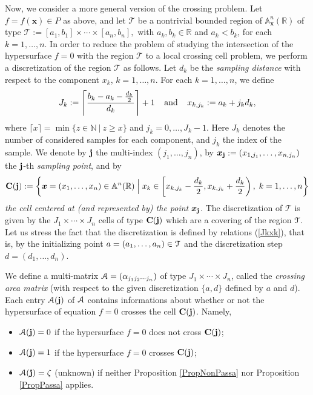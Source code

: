 \documentclass[10pt]{article}
\newcommand\sA{{\cal A}}
\newcommand\sT{{\cal T}}
\newcommand\gra{\alpha}
\newcommand\reals{{\mathbb R}}
\newcommand{\x}{{\bm x}}
\begin{document}
{Now, we consider a more general version of the crossing problem. 
Let $f=f(\x)\in P$  as above, and let $\mathcal T$ be a nontrivial bounded region 
of ${\mathbb A}_{\x}^n(\reals)$ of   type
$
\mathcal T := [a_1,b_1] \times \cdots \times [a_n,b_n],
$
with $a_k, b_k \in \reals$ and $a_k < b_k$, for each $k=1,\ldots,n$.
In order to reduce the problem of studying the intersection  of the hypersurface $f=0$  with the region $\mathcal T$
to a local crossing cell problem, we perform a discretization of 
the region $\mathcal T$ as follows.
Let $d_k$ be  the {\em sampling distance} with respect to the  component $x_k$, $k=1,\ldots,n$.
For each $k=1,\ldots,n$, we define 
\begin{equation}\label{Jkxk}
 J_k := \left \lceil \frac{b_k-a_k- \frac{d_k}{2}}{d_k} \right \rceil + 1 \; \;\;\; {\rm and} \;\;\; \;x_{k,j_k} :=a_k + j_k d_k,   
\end{equation}
where $\lceil x \rceil = \min\{z \in \mathbb N \:|\: z  \ge x\}$ and
$j_k=0,\ldots, J_k-1$. Here $J_k$ denotes the number of considered samples for each component, and $j_k$ the index of the sample.
We denote by ${\bf j}$ the multi-index $(j_1,\ldots, j_n)$,
by ${\x}_{\bf j}:=(x_{1,j_1},\ldots,x_{n, j_n})$ the ${\bf j}$-th {\em sampling point}, 
and by
\begin{equation*}\label{cells}
{\bf C}({\bf j}):=\left\{ {\x} =( x_1,\ldots, x_n ) \in \mathbb A^n(\reals) \; \Big| \;  
x_k\in \left[x_{k,j_k}-\frac{d_k}{2}, x_{k,j_k}+\frac{d_k}{2}\right),\; k=1,\ldots,n \right\} 
\end{equation*}
{\em the cell centered at (and represented by) the point} ${\x}_{\bf j}$.
The discretization of $\mathcal T$ is given by the $J_1\times \cdots \times J_n$ cells 
of type ${\bf C}({\bf j})$ which are  a covering of the region $\sT$.
Let us stress the fact that the discretization is defined by relations (\ref{Jkxk}), that is, 
by the initializing point $a=(a_1,\ldots,a_n) \in \sT$ and the discretization step 
$d=(d_1,\ldots,d_n)$. 

 We define 
a multi-matrix $\sA=(\gra_{j_1j_2\cdots j_n})$ of type $ J_1\times \cdots \times J_n$, 
called the {\em crossing area  matrix} (with respect to the given discretization $\{a,d\}$ defined by $a$ and $d$).   
Each entry $\sA({\bf j})$ of $\sA$ contains informations about  whether or not  the hypersurface  of equation  $f=0$  crosses the cell ${\bf C}({\bf j})$.
Namely,
\begin{itemize}
\item $\sA({\bf j})=0$ if the hypersurface $f=0$ does not cross ${\bf C}({\bf j})$;
\item $\sA({\bf j})=1$ if the hypersurface  $f=0$ crosses ${\bf C}({\bf j})$;
\item $\sA({\bf j})=\zeta$ (unknown) if neither Proposition \ref{PropNonPassa} nor Proposition  \ref{PropPassa} applies.
\end{itemize}

}
\end{document}

